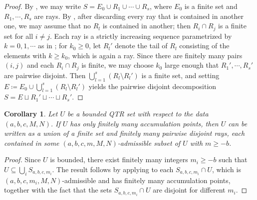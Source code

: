 \documentclass[english,oneside]{smfart}
\newtheorem{corollary}[theorem]{Corollary}
\begin{document}
\begin{proof}
    By , we may write $S=E_0\cup R_1\cup\cdots\cup R_s$, where $E_0$ is a finite set and $R_1,\cdots,R_s$ are rays. By , after discarding every ray that is contained in another one, we may assume that no $R_l$ is contained in another; then $R_i\cap R_j$ is a finite set for all $i\neq j$. Each ray is a strictly increasing sequence parametrized by $k=0,1,\cdots$ as in ; for $k_0\geq 0$, let $R_l'$ denote the tail of $R_l$ consisting of the elements with $k\geq k_0$, which is again a ray. Since there are finitely many pairs $(i,j)$ and each $R_i\cap R_j$ is finite, we may choose $k_0$ large enough that $R_1',\cdots,R_s'$ are pairwise disjoint. Then $\bigcup_{l=1}^s(R_l\setminus R_l')$ is a finite set, and setting $E\coloneqq E_0\cup\bigcup_{l=1}^s(R_l\setminus R_l')$ yields the pairwise disjoint decomposition $S=E\sqcup R_1'\sqcup\cdots\sqcup R_s'$.
\end{proof}
\begin{corollary}\label{coro:48108}
    Let $U$ be a bounded QTR set with respect to the data $(a,b,c,M,N)$. If $U$ has only finitely many accumulation points, then $U$ can be written as a union of a finite set and finitely many pairwise disjoint rays, each contained in some $(a,b,c,m,M,N)$-admissible subset of $U$ with $m\geq -b$.
\end{corollary}
\begin{proof}
    Since $U$ is bounded, there exist finitely many integers $m_i\geq -b$ such that $U\subseteq \bigcup_i S_{a,b,c,m_i}$. The result follows by applying  to each $S_{a,b,c,m_i}\cap U$, which is $(a,b,c,m_i,M,N)$-admissible and has finitely many accumulation points, together with the fact that the sets $S_{a,b,c,m_i}\cap U$ are disjoint for different $m_i$.
\end{proof}
\end{document}
